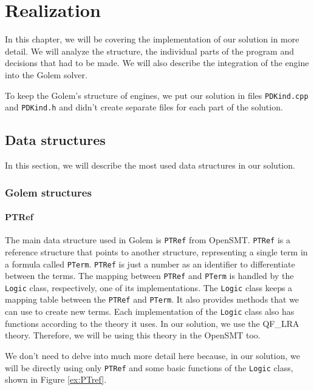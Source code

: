 \chapter{Realization}
\noindent In this chapter, we will be covering the implementation of our solution in more detail. We will analyze the structure, the individual parts of the program and decisions that had to be made. We will also describe the integration of the engine into the Golem solver.

To keep the Golem's structure of engines, we put our solution in files 
\texttt{PDKind.cpp} and \texttt{PDKind.h} and didn't create separate files for each part of the solution.

\section{Data structures}
\noindent In this section, we will describe the most used data structures in our solution. 
\subsection{Golem structures}

\subsubsection{PTRef}
\noindent The main data structure used in Golem is \texttt{PTRef} from OpenSMT. \texttt{PTRef} is a reference structure that points to another structure, representing a single term in a formula called \texttt{PTerm}. \texttt{PTRef} is just a number as an identifier to differentiate between the terms. The mapping between \texttt{PTRef} and \texttt{PTerm} is handled by the \texttt{Logic} class, respectively, one of its implementations. The \texttt{Logic} class keeps a mapping table between the \texttt{PTRef} and \texttt{PTerm}. It also provides methods that we can use to create new terms. Each implementation of the \texttt{Logic} class also has functions according to the theory it uses. In our solution, we use the QF\_LRA theory. Therefore, we will be using this theory in the OpenSMT too. 

We don't need to delve into much more detail here because, in our solution, we will be directly using only \texttt{PTRef} and some basic functions of the \texttt{Logic} class, shown in Figure \ref{ex:PTref}.

